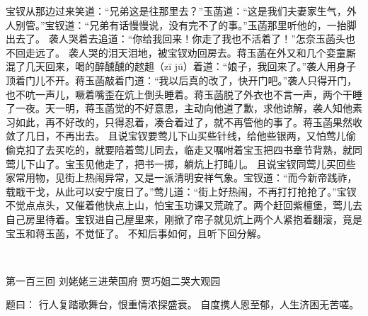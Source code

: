 \documentclass[12pt,oneside]{book}
\begin{document}
宝钗从那边过来笑道：“兄弟这是往那里去？”玉菡道：“这是我们夫妻家生气，外人别管。”宝钗道：“兄弟有话慢慢说，没有完不了的事。”玉菡那里听他的，一抬脚出去了。
袭人哭着去追道：“你给我回来！你走了我也不活着了！”怎奈玉菡头也不回走远了。
袭人哭的泪天泪地，被宝钗劝回房去。蒋玉菡在外又和几个娈童厮混了几天回来，喝的醉醺醺的趑趄（zī jū）着道：“娘子，我回来了。”袭人用身子顶着门儿不开。蒋玉菡敲着门道：“我以后真的改了，快开门吧。”袭人只得开门，也不吭一声儿，噘着嘴歪在炕上倒头睡着。蒋玉菡脱了外衣也不言一声，两个干睡了一夜。天一明，蒋玉菡觉的不好意思，主动向他道了歉，求他谅解，袭人知他素习如此，再不好改的，只得忍着，凑合着过了，就不再管他的事了。蒋玉菡果然收敛了几日，不再出去。
且说宝钗要莺儿下山买些针线，给他些银两，又怕莺儿偷偷克扣了去买吃的，就要陪着莺儿同去，临走又嘱咐着宝玉把四书章节背熟，就同莺儿下山了。宝玉见他走了，把书一掷，躺炕上打盹儿。
且说宝钗同莺儿买回些家常用物，见街上热闹异常，又是一派清明安祥气象。宝钗道：“而今新帝践祚，载戢干戈，从此可以安宁度日了。”莺儿道：“街上好热闹，不再打打抢抢了。”宝钗不觉点点头，又催着他快点上山，怕宝玉功课又荒疏了。两个赶回紫檀堡，莺儿去自己房里待着。宝钗进自己屋里来，刚掀了帘子就见炕上两个人紧抱着翻滚，竟是宝玉和蒋玉菡，不觉怔了。
不知后事如何，且听下回分解。

 
 
第一百三回 刘姥姥三进荣国府 贾巧姐二哭大观园

题曰：
行人复踏歌舞台，恨重情浓探盛衰。
自度携人恩至郁，人生济困无苦嗟。
\end{document}
